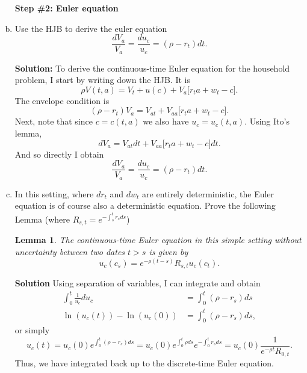 \documentclass[11pt]{extarticle}
\theoremstyle{plain}
\newtheorem{lem}[thm]{Lemma}
\theoremstyle{definition}
\begin{document}
\begin{enumerate}[(a)]
\vspace{5mm}
\noindent
\textbf{Step \#2: Euler equation }



\item Use the HJB to derive the euler equation
\begin{equation*}
	\frac{dV_a}{V_a} = \frac{du_c}{u_c} =  (\rho - r_t) dt. 
\end{equation*}

\textbf{Solution:} 
\vspace{3mm}
\noindent
To derive the continuous-time Euler equation for the household problem, I start by writing down the HJB. It is 
\begin{equation*}
	\rho V(t,a) = V_t + u(c) + V_a \Big[ r_t a + w_t - c \Big]. 
\end{equation*}
The envelope condition is 
\begin{equation*}
	(\rho - r_t) V_a = V_{at} +  V_{aa} \Big[ r_t a + w_t - c \Big] .
\end{equation*}
Next, note that since $c = c(t,a)$ we also have $u_c = u_c(t,a)$. Using Ito's lemma, 
\begin{equation*}
	dV_a = V_{at} dt + V_{aa} \Big[ r_t a + w_t - c \Big] dt. 
\end{equation*}
And so directly I obtain 
\begin{equation*}
	\frac{dV_a}{V_a} = \frac{du_c}{u_c} =  (\rho - r_t) dt. 
\end{equation*}


\item In this setting, where $dr_t$ and $dw_t$ are entirely deterministic, the Euler equation is of course also a deterministic equation. Prove the following Lemma (where $R_{s,t}=e^{-\int_s^t r_s ds}$)
\begin{lem} 
	
	The continuous-time Euler equation in this simple setting without uncertainty between two dates $t > s$ is given by
	\begin{equation*}
		u_c(c_s) = e^{- \rho (t-s)} R_{s,t} u_c(c_t). 
	\end{equation*}
\end{lem}

\textbf{Solution}
Using separation of variables, I can integrate and obtain 
\begin{align*}
	\int_0^t \frac{1}{u_c} du_c &=  \int_0^t (\rho - r_s) ds \\
	\ln(u_c(t)) - \ln(u_c(0)) &=  \int_0^t (\rho - r_s) ds,
\end{align*}
or simply 
\begin{equation*}
	u_c(t) = u_c(0) e^{\int_0^t (\rho - r_s) ds} = u_c(0) e^{\int_0^t \rho ds} e^{- \int_0^t r_s ds} = u_c(0) \frac{1 }{e^{-\rho t}R_{0,t}}.
\end{equation*}
Thus, we have integrated back up to the discrete-time Euler equation. 



\end{enumerate}
\end{document}
